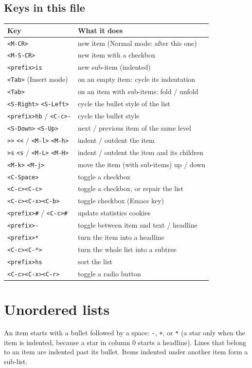 \subsection{Keys in this file}
\label{sec:orgc60e13e}
\begin{center}
\begin{tabular}{ll}
Key & What it does\\
\hline
\texttt{<M-CR>} & new item (Normal mode: after this one)\\
\texttt{<M-S-CR>} & new item with a checkbox\\
\texttt{<prefix>is} & new sub-item (indented)\\
\texttt{<Tab>} (Insert mode) & on an empty item: cycle its indentation\\
\texttt{<Tab>} & on an item with sub-items: fold / unfold\\
\texttt{<S-Right>} \texttt{<S-Left>} & cycle the bullet style of the list\\
\texttt{<prefix>hb} / \texttt{<C-c>-} & cycle the bullet style\\
\texttt{<S-Down>} \texttt{<S-Up>} & next / previous item of the same level\\
\texttt{>{}>{}} \texttt{<{}<{}} / \texttt{<M-l>} \texttt{<M-h>} & indent / outdent the item\\
\texttt{>s} \texttt{<s} / \texttt{<M-L>} \texttt{<M-H>} & indent / outdent the item and its children\\
\texttt{<M-k>} \texttt{<M-j>} & move the item (with sub-items) up / down\\
\texttt{<C-Space>} & toggle a checkbox\\
\texttt{<C-c><C-c>} & toggle a checkbox, or repair the list\\
\texttt{<C-c><C-x><C-b>} & toggle checkbox (Emacs key)\\
\texttt{<prefix>\#} / \texttt{<C-c>\#} & update statistics cookies\\
\texttt{<prefix>-} & toggle between item and text / headline\\
\texttt{<prefix>*} & turn the item into a headline\\
\texttt{<C-c><C-*>} & turn the whole list into a subtree\\
\texttt{<prefix>hs} & sort the list\\
\texttt{<C-c><C-x><C-r>} & toggle a radio button\\
\end{tabular}
\end{center}
\section{Unordered lists}
\label{sec:org27a19fc}
An item starts with a bullet followed by a space: \texttt{-}, \texttt{+}, or \texttt{*} (a star
only when the item is indented, because a star in column 0 starts a
headline). Lines that belong to an item are indented past its bullet.
Items indented under another item form a sub-list.

